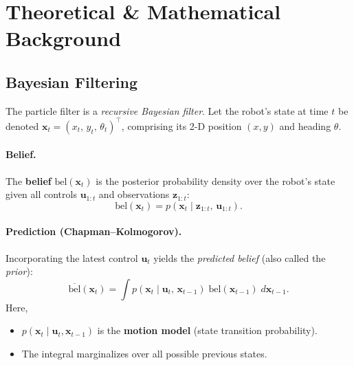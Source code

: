 \documentclass[12pt, a4paper]{article}
\begin{document}
\section{Theoretical \& Mathematical Background}
\label{sec:theory}

\subsection{Bayesian Filtering}
\label{subsec:bayes}

The particle filter is a \emph{recursive Bayesian filter}.  Let the robot's state at time \(t\) be denoted \(\mathbf{x}_t = (x_t,\, y_t,\, \theta_t)^\top\), comprising its 2-D position \((x, y)\) and heading \(\theta\).

\paragraph{Belief.}
The \textbf{belief} \(\text{bel}(\mathbf{x}_t)\) is the posterior probability density over the robot's state given all controls \(\mathbf{u}_{1:t}\) and observations \(\mathbf{z}_{1:t}\):
\begin{equation}
  \text{bel}(\mathbf{x}_t) = p(\mathbf{x}_t \mid \mathbf{z}_{1:t},\, \mathbf{u}_{1:t}).
  \label{eq:belief}
\end{equation}

\paragraph{Prediction (Chapman–Kolmogorov).}
Incorporating the latest control \(\mathbf{u}_t\) yields the \textit{predicted belief} (also called the \textit{prior}):
\begin{equation}
  \overline{\text{bel}}(\mathbf{x}_t)
    = \int p(\mathbf{x}_t \mid \mathbf{u}_t,\, \mathbf{x}_{t-1})\;
          \text{bel}(\mathbf{x}_{t-1})\; d\mathbf{x}_{t-1}.
  \label{eq:predict}
\end{equation}
Here,
\begin{itemize}[nosep]
  \item \(p(\mathbf{x}_t \mid \mathbf{u}_t, \mathbf{x}_{t-1})\) is the \textbf{motion model} (state transition probability).
  \item The integral marginalizes over all possible previous states.
\end{itemize}
\end{document}
